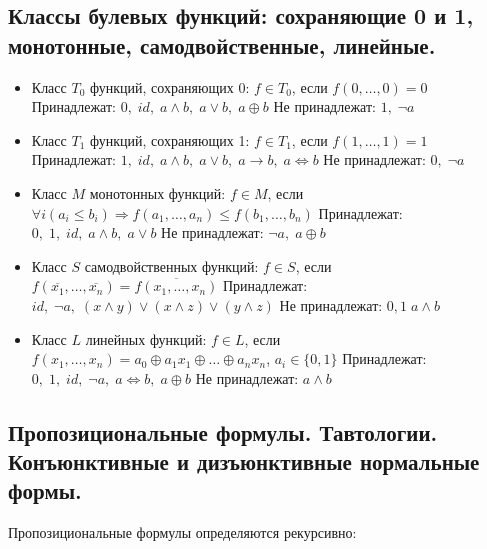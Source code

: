 \subsection{Классы булевых функций: сохраняющие 0 и 1, монотонные, самодвойственные, линейные.}
\begin{itemize}
    \item Класс $T_0$ функций, сохраняющих 0:
    $f \in T_{0}$, если $f(0,\dots ,0)=0$
    \newline Принадлежат: $0,\; id,\; a\land b, \; a\lor b,\; a\oplus b$ 
    \newline Не принадлежат: $1, \; \neg a$ 
    
    \item Класс $T_1$ функций, сохраняющих 1:
    $f \in T_{1}$, если $f(1,\dots ,1)=1$
    \newline Принадлежат: $1,\; id,\; a\land b,\; a\lor b,\; a\rightarrow b,\; a\Leftrightarrow b$ 
    \newline Не принадлежат: $0,\; \neg a$ 
    
    \item Класс $M$ монотонных функций:
    $f \in M$, если $\forall i(a_{i}\leqslant b_{i})\Rightarrow f(a_{1},\dots ,a_{n})\leqslant f(b_{1},\dots ,b_{n})$
    \newline Принадлежат: $0,\; 1,\; id,\; a\land b,\; a\lor b$ 
    \newline Не принадлежат: $\neg a, \; a\oplus b $ 
    
    \item Класс $S$ самодвойственных функций:
    $f \in S$, если $f(\overline {x_{1}},\dots ,\overline {x_{n}})=\overline {f(x_{1},\dots ,x_{n})}$
    \newline Принадлежат: $id,\; \neg a,\; (x\land y)\lor (x\land z)\lor (y\land z)$ 
    \newline Не принадлежат: $0, 1\; a\land b $ 
    
    \item Класс $L$ линейных функций:
    $f\in L$, если $f(x_{1},\dots ,x_{n})=a_{0}\oplus a_{1}x_{1}\oplus \dots \oplus a_{n}x_{n}$, $a_{i}\in \{0,1\}$
    \newline Принадлежат: $0,\; 1,\; id,\; \neg a,\; a\Leftrightarrow b,\; a \oplus b$ 
    \newline Не принадлежат: $a\land b $ 
    
\end{itemize}

\subsection{Пропозициональные формулы. Тавтологии. Конъюнктивные и дизъюнктивные нормальные формы.}
Пропозициональные формулы определяются рекурсивно:

